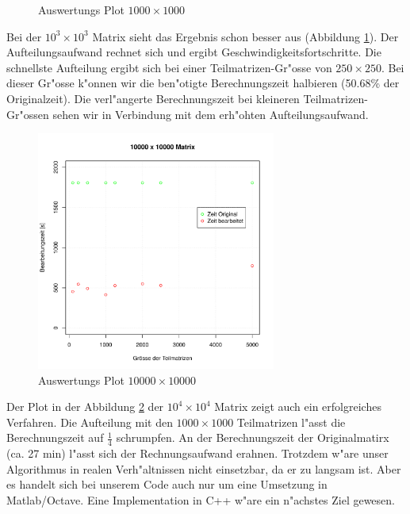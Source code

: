 \begin{refsection}
\begin{figure}
\begin{center}
\end{center}
\caption{Auswertungs Plot $1000\times1000$}
\label{qq}
\end{figure}
Bei der $10^3\times10^3$ Matrix sieht das Ergebnis schon besser aus (Abbildung \ref{qq}). Der Aufteilungsaufwand rechnet sich und ergibt Geschwindigkeitsfortschritte. Die schnellste Aufteilung ergibt sich bei einer Teilmatrizen-Gr"osse von $250\times250$. Bei dieser Gr"osse k"onnen wir die ben"otigte Berechnungszeit halbieren (50.68\% der Originalzeit). Die verl"angerte Berechnungszeit bei kleineren Teilmatrizen-Gr"ossen sehen wir in Verbindung mit dem erh"ohten Aufteilungsaufwand.
\begin{figure}
\begin{center}
\includegraphics[width=0.7\textwidth]{./mapreduce/PC10000.pdf}
\end{center}
\caption{Auswertungs Plot $10000\times10000$}
\label{qqq}
\end{figure}
Der Plot in der Abbildung \ref{qqq} der $10^4\times10^4$ Matrix zeigt auch ein erfolgreiches Verfahren. Die Aufteilung mit den $1000\times1000$ Teilmatrizen l"asst die Berechnungszeit auf $\frac{1}{4}$ schrumpfen.
An der Berechnungszeit der Originalmatirx (ca. 27 min) l"asst sich der Rechnungsaufwand erahnen. Trotzdem w"are unser Algorithmus in realen Verh"altnissen nicht einsetzbar, da er zu langsam ist. Aber es handelt sich bei unserem Code auch nur um eine Umsetzung in Matlab/Octave. Eine Implementation in C++ w"are ein n"achstes Ziel gewesen.

\end{refsection}
